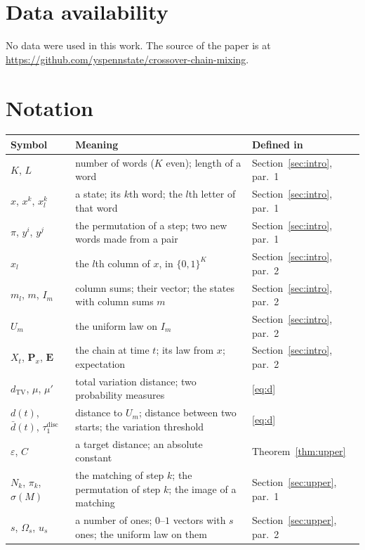 \documentclass[11pt]{amsart}
\theoremstyle{remark}
\numberwithin{equation}{section}
\newcommand{\TV}{d_{\mathrm{TV}}}
\newcommand{\Pm}{\mathbf P}
\newcommand{\E}{\mathbf E}
\begin{document}
\section*{Data availability}
No data were used in this work. The source of the paper is at \url{https://github.com/yspennstate/crossover-chain-mixing}.

\appendix
\section{Notation}\label{app:notation}

\begin{center}
\renewcommand{\arraystretch}{1.15}
\begin{tabular}{p{}p{}p{}}
\toprule
Symbol & Meaning & Defined in\\\midrule
$K$, $L$ & number of words ($K$ even); length of a word & Section~\ref{sec:intro}, par.~1\\
$x$, $x^k$, $x^k_l$ & a state; its $k$th word; the $l$th letter of that word & Section~\ref{sec:intro}, par.~1\\
$\pi$, $y^i$, $y^j$ & the permutation of a step; two new words made from a pair & Section~\ref{sec:intro}, par.~1\\
$x_l$ & the $l$th column of $x$, in $\{0,1\}^K$ & Section~\ref{sec:intro}, par.~2\\
$m_l$, $m$, $I_m$ & column sums; their vector; the states with column sums $m$ & Section~\ref{sec:intro}, par.~2\\
$U_m$ & the uniform law on $I_m$ & Section~\ref{sec:intro}, par.~2\\
$X_t$, $\Pm_x$, $\E$ & the chain at time $t$; its law from $x$; expectation & Section~\ref{sec:intro}, par.~2\\
$\TV$, $\mu$, $\mu'$ & total variation distance; two probability measures & \eqref{eq:d}\\
$d(t)$, $\bar d(t)$, $\tau_1^{\mathrm{disc}}$ & distance to $U_m$; distance between two starts; the variation threshold & \eqref{eq:d}\\
$\varepsilon$, $C$ & a target distance; an absolute constant & Theorem~\ref{thm:upper}\\
$N_k$, $\pi_k$, $\sigma(M)$ & the matching of step $k$; the permutation of step $k$; the image of a matching & Section~\ref{sec:upper}, par.~1\\
$s$, $\Omega_s$, $u_s$ & a number of ones; $0$--$1$ vectors with $s$ ones; the uniform law on them & Section~\ref{sec:upper}, par.~2\\

\end{tabular}
\end{center}
\end{document}
